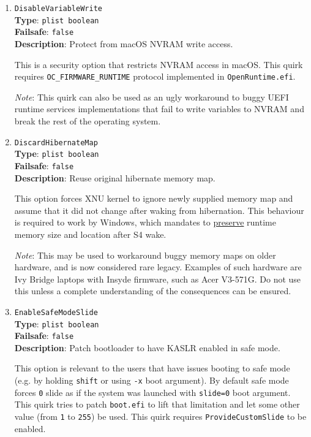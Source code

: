 \documentclass[]{article}
\begin{document}
\begin{enumerate}
\item
  \texttt{DisableVariableWrite}\\
  \textbf{Type}: \texttt{plist\ boolean}\\
  \textbf{Failsafe}: \texttt{false}\\
  \textbf{Description}: Protect from macOS NVRAM write access.

  This is a security option that restricts NVRAM access in macOS.
  This quirk requires \texttt{OC\_FIRMWARE\_RUNTIME} protocol implemented
  in \texttt{OpenRuntime.efi}.

  \emph{Note}: This quirk can also be used as an ugly workaround to buggy UEFI
  runtime services implementations that fail to write variables to NVRAM and
  break the rest of the operating system.

\item
  \texttt{DiscardHibernateMap}\\
  \textbf{Type}: \texttt{plist\ boolean}\\
  \textbf{Failsafe}: \texttt{false}\\
  \textbf{Description}: Reuse original hibernate memory map.

  This option forces XNU kernel to ignore newly supplied memory map and assume
  that it did not change after waking from hibernation. This behaviour is required
  to work by Windows, which mandates to
  \href{https://docs.microsoft.com/en-us/windows-hardware/design/device-experiences/oem-uefi#hibernation-state-s4-transition-requirements}{preserve}
  runtime memory size and location after S4 wake.

  \emph{Note}: This may be used to workaround buggy memory maps on older hardware,
  and is now considered rare legacy. Examples of such hardware are Ivy Bridge laptops
  with Insyde firmware, such as Acer V3-571G. Do not use this unless a complete understanding of
  the consequences can be ensured.

\item
  \texttt{EnableSafeModeSlide}\\
  \textbf{Type}: \texttt{plist\ boolean}\\
  \textbf{Failsafe}: \texttt{false}\\
  \textbf{Description}: Patch bootloader to have KASLR enabled in safe mode.

  This option is relevant to the users that have issues booting to safe mode
  (e.g. by holding \texttt{shift} or using \texttt{-x} boot argument). By default
  safe mode forces \texttt{0} slide as if the system was launched with \texttt{slide=0}
  boot argument. This quirk tries to patch \texttt{boot.efi} to lift that limitation
  and let some other value (from \texttt{1} to \texttt{255}) be used. This quirk requires
  \texttt{ProvideCustomSlide} to be enabled.


\end{enumerate}
\end{document}
